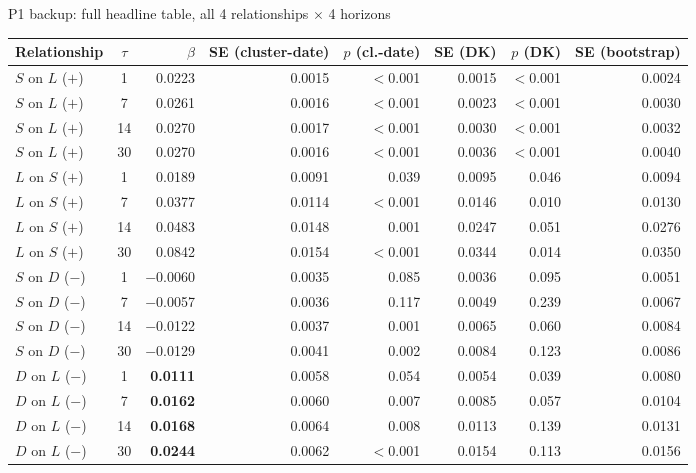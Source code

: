 \documentclass[aspectratio=169]{beamer}
\begin{document}
\begin{frame}{P1 backup: full headline table, all 4 relationships $\times$ 4 horizons}
  \tiny
  \begin{center}
  \begin{tabular}{@{}l c r r r r r r@{}}
    \toprule
    Relationship & $\tau$ & $\beta$ & SE (cluster-date) & $p$ (cl.-date) & SE (DK) & $p$ (DK) & SE (bootstrap) \\
    \midrule
    $S$ on $L$ ($+$) & 1  & 0.0223 & 0.0015 & $<$0.001 & 0.0015 & $<$0.001 & 0.0024 \\
    $S$ on $L$ ($+$) & 7  & 0.0261 & 0.0016 & $<$0.001 & 0.0023 & $<$0.001 & 0.0030 \\
    $S$ on $L$ ($+$) & 14 & 0.0270 & 0.0017 & $<$0.001 & 0.0030 & $<$0.001 & 0.0032 \\
    $S$ on $L$ ($+$) & 30 & 0.0270 & 0.0016 & $<$0.001 & 0.0036 & $<$0.001 & 0.0040 \\
    \midrule
    $L$ on $S$ ($+$) & 1  & 0.0189 & 0.0091 & 0.039 & 0.0095 & 0.046 & 0.0094 \\
    $L$ on $S$ ($+$) & 7  & 0.0377 & 0.0114 & $<$0.001 & 0.0146 & 0.010 & 0.0130 \\
    $L$ on $S$ ($+$) & 14 & 0.0483 & 0.0148 & 0.001 & 0.0247 & 0.051 & 0.0276 \\
    $L$ on $S$ ($+$) & 30 & 0.0842 & 0.0154 & $<$0.001 & 0.0344 & 0.014 & 0.0350 \\
    \midrule
    $S$ on $D$ ($-$) & 1  & $-$0.0060 & 0.0035 & 0.085 & 0.0036 & 0.095 & 0.0051 \\
    $S$ on $D$ ($-$) & 7  & $-$0.0057 & 0.0036 & 0.117 & 0.0049 & 0.239 & 0.0067 \\
    $S$ on $D$ ($-$) & 14 & $-$0.0122 & 0.0037 & 0.001 & 0.0065 & 0.060 & 0.0084 \\
    $S$ on $D$ ($-$) & 30 & $-$0.0129 & 0.0041 & 0.002 & 0.0084 & 0.123 & 0.0086 \\
    \midrule
    $D$ on $L$ ($-$) & 1  & \textbf{0.0111} & 0.0058 & 0.054 & 0.0054 & 0.039 & 0.0080 \\
    $D$ on $L$ ($-$) & 7  & \textbf{0.0162} & 0.0060 & 0.007 & 0.0085 & 0.057 & 0.0104 \\
    $D$ on $L$ ($-$) & 14 & \textbf{0.0168} & 0.0064 & 0.008 & 0.0113 & 0.139 & 0.0131 \\
    $D$ on $L$ ($-$) & 30 & \textbf{0.0244} & 0.0062 & $<$0.001 & 0.0154 & 0.113 & 0.0156 \\
    \bottomrule
  \end{tabular}
  \end{center}

\end{frame}
\end{document}
